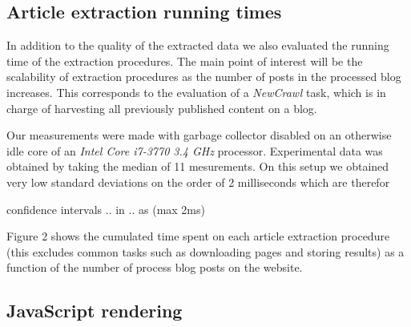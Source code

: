 \subsection{Article extraction running times}

In addition to the quality of the extracted data we also evaluated the running time of the extraction procedures. The main point of interest will be the scalability of extraction procedures as the number of posts in the processed blog increases. This corresponds to the evaluation of a \emph{NewCrawl} task, which is in charge of harvesting all previously published content on a blog.

Our measurements were made with garbage collector disabled on an otherwise idle core of an \emph{Intel Core i7-3770 3.4 GHz} processor. Experimental data was obtained by taking the median of 11 mesurements. On this setup we obtained very low standard deviations on the order of 2 milliseconds which are therefor


confidence intervals .. in .. as (max 2ms)

Figure 2 shows the cumulated time spent on each article extraction procedure (this excludes common tasks such as downloading pages and storing results) as a function of the number of process blog posts on the  website.





\subsection{JavaScript rendering}





